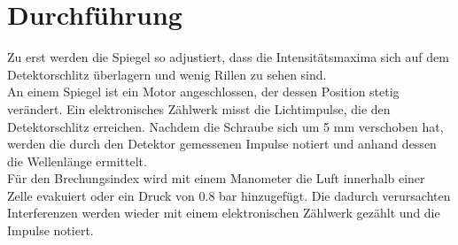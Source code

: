 \section{Durchführung}
\label{sec:Durchführung}

Zu erst werden die Spiegel so adjustiert, dass die Intensitätsmaxima sich auf dem Detektorschlitz überlagern und wenig Rillen zu sehen sind. \\
An einem Spiegel ist ein Motor angeschlossen, der dessen Position stetig verändert. Ein elektronisches Zählwerk misst die Lichtimpulse, die den Detektorschlitz erreichen. Nachdem die Schraube sich um 5 mm verschoben hat, werden die durch den Detektor gemessenen Impulse notiert und anhand dessen die Wellenlänge ermittelt.\\
Für den Brechungsindex wird mit einem Manometer die Luft innerhalb einer Zelle evakuiert oder ein Druck von 0.8 bar hinzugefügt. Die dadurch verursachten Interferenzen werden wieder mit einem elektronischen Zählwerk gezählt und die Impulse notiert.
